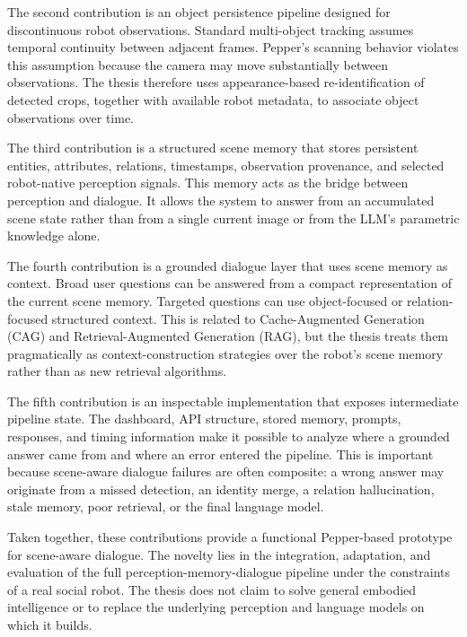 The second contribution is an object persistence pipeline designed for discontinuous robot observations. Standard multi-object tracking assumes temporal continuity between adjacent frames. Pepper's scanning behavior violates this assumption because the camera may move substantially between observations. The thesis therefore uses appearance-based re-identification of detected crops, together with available robot metadata, to associate object observations over time.

The third contribution is a structured scene memory that stores persistent entities, attributes, relations, timestamps, observation provenance, and selected robot-native perception signals. This memory acts as the bridge between perception and dialogue. It allows the system to answer from an accumulated scene state rather than from a single current image or from the LLM's parametric knowledge alone.

The fourth contribution is a grounded dialogue layer that uses scene memory as context. Broad user questions can be answered from a compact representation of the current scene memory. Targeted questions can use object-focused or relation-focused structured context. This is related to Cache-Augmented Generation (CAG) and Retrieval-Augmented Generation (RAG), but the thesis treats them pragmatically as context-construction strategies over the robot's scene memory rather than as new retrieval algorithms.

The fifth contribution is an inspectable implementation that exposes intermediate pipeline state. The dashboard, API structure, stored memory, prompts, responses, and timing information make it possible to analyze where a grounded answer came from and where an error entered the pipeline. This is important because scene-aware dialogue failures are often composite: a wrong answer may originate from a missed detection, an identity merge, a relation hallucination, stale memory, poor retrieval, or the final language model.

Taken together, these contributions provide a functional Pepper-based prototype for scene-aware dialogue. The novelty lies in the integration, adaptation, and evaluation of the full perception-memory-dialogue pipeline under the constraints of a real social robot. The thesis does not claim to solve general embodied intelligence or to replace the underlying perception and language models on which it builds.


